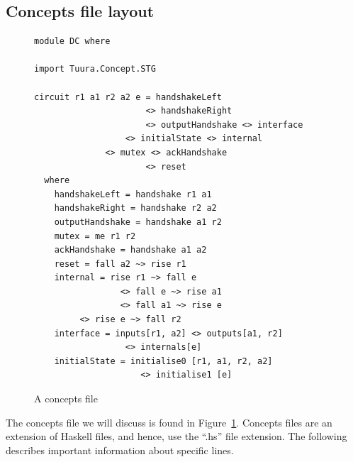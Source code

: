 \documentclass[british,conference,compsoc]{IEEEtran}
\begin{document}
\subsection{Concepts file layout \label{sub:file_layout}}

\vspace{-3mm}

\begin{figure}[h]
\begin{centering}

\begin{verbatim}
module DC where

import Tuura.Concept.STG

circuit r1 a1 r2 a2 e = handshakeLeft 
                      <> handshakeRight 
                      <> outputHandshake <> interface 
	              <> initialState <> internal 
		      <> mutex <> ackHandshake 
                      <> reset
  where
  	handshakeLeft = handshake r1 a1
  	handshakeRight = handshake r2 a2
  	outputHandshake = handshake a1 r2
  	mutex = me r1 r2 
  	ackHandshake = handshake a1 a2
	reset = fall a2 ~> rise r1
  	internal = rise r1 ~> fall e 
                 <> fall e ~> rise a1 
                 <> fall a1 ~> rise e
		 <> rise e ~> fall r2
	interface = inputs[r1, a2] <> outputs[a1, r2] 
                  <> internals[e]
	initialState = initialise0 [r1, a1, r2, a2] 
                     <> initialise1 [e]
\end{verbatim}

\par\end{centering}
\vspace{-2mm}
\begin{centering}
\protect\caption{\label{fig:concepts_file}A concepts file}
\vspace{-2mm}
\par\end{centering}

\end{figure}

The concepts file we will discuss is found in Figure~\ref{fig:concepts_file}.
Concepts files are an extension of Haskell files, and hence, use the ``.hs'' file extension.
The following describes important information about specific lines.
\end{document}
